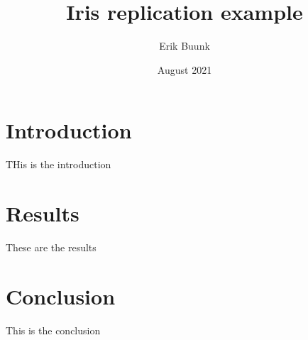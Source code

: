 \documentclass{article}
\title{Iris replication example}
\author{Erik Buunk}
\date{August 2021}
\begin{document}
\maketitle

\section{Introduction}
THis is the introduction

\section{Results}
These are the results


\section{Conclusion}
This is the conclusion



\end{document}
